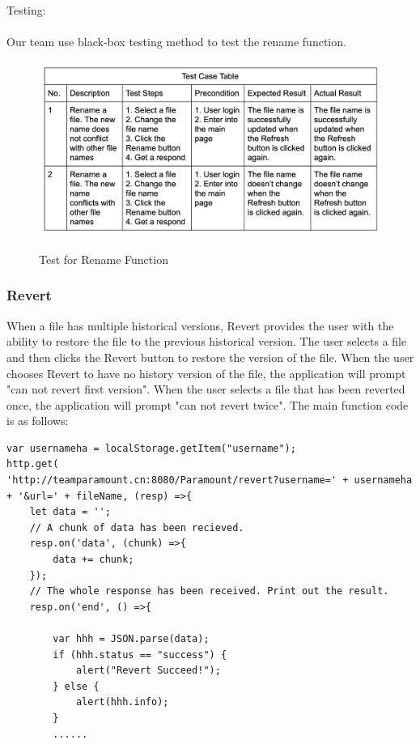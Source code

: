 \documentclass[11pt]{article}
\begin{document}
 
 Testing:
 \\
 \\
 Our team use black-box testing method to test the rename function.
 \begin{figure}[htbp]
 	\centering
 	\includegraphics[width=12cm]{6.png}\\
 	\caption{Test for Rename Function}
 \end{figure}

\subsubsection{Revert}
When a file has multiple historical versions, Revert provides the user with the ability to restore the file to the previous historical version. The user selects a file and then clicks the Revert button to restore the version of the file. When the user chooses Revert to have no history version of the file, the application will prompt "can not revert first version". When the user selects a file that has been reverted once, the application will prompt "can not revert twice". The main function code is as follows:
\begin{lstlisting}
var usernameha = localStorage.getItem("username");
http.get(
'http://teamparamount.cn:8080/Paramount/revert?username=' + usernameha + '&url=' + fileName, (resp) =>{
	let data = '';
	// A chunk of data has been recieved.
	resp.on('data', (chunk) =>{
		data += chunk;
	});
	// The whole response has been received. Print out the result.
	resp.on('end', () =>{
		
		var hhh = JSON.parse(data);
		if (hhh.status == "success") {
			alert("Revert Succeed!");
		} else {
			alert(hhh.info);
		}
		......
\end{lstlisting}
\end{document}
